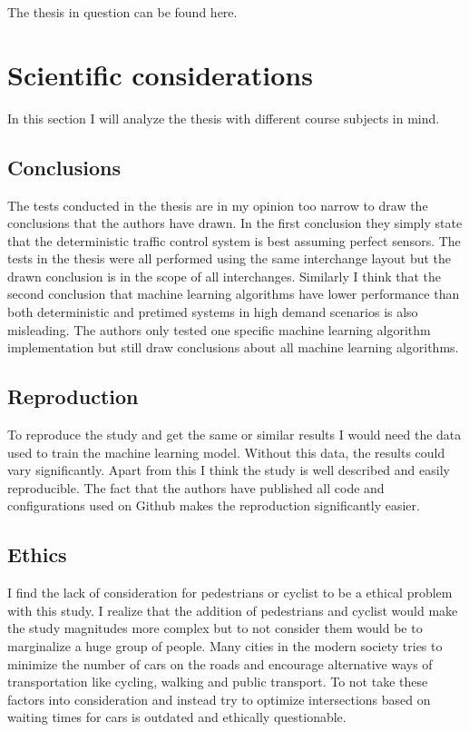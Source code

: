 \documentclass[10pt, a4paper]{article}
\begin{document}
The thesis in question can be found here\cite{thesis}.

\section{Scientific considerations}
In this section I will analyze the thesis with different course subjects in mind.

\subsection{Conclusions}
The tests conducted in the thesis are in my opinion too narrow to draw the conclusions that the authors have drawn. In the first conclusion
they simply state that the deterministic traffic control system is best assuming perfect sensors.
The tests in the thesis were all performed using the same interchange layout but the drawn conclusion is in the scope of all interchanges.
Similarly I think that the second conclusion that machine learning algorithms have lower performance than both deterministic and pretimed
systems in high demand scenarios is also misleading. The authors only tested one specific machine learning algorithm implementation but still
draw conclusions about all machine learning algorithms.

\subsection{Reproduction}
To reproduce the study and get the same or similar results I would need the data used to train the machine learning model.
Without this data, the results could vary significantly. Apart from this I think the study is well described and easily reproducible.
The fact that the authors have published all code and configurations used on Github makes the reproduction significantly easier.

\subsection{Ethics}
I find the lack of consideration for pedestrians or cyclist to be a ethical problem with this study. I realize that the addition of pedestrians
and cyclist would make the study magnitudes more complex but to not consider them would be to marginalize a huge group of people.
Many cities in the modern society tries to minimize the number of cars on the roads and encourage alternative ways of transportation
like cycling, walking and public transport. To not take these factors into consideration and instead try to optimize intersections based on
waiting times for cars is outdated and ethically questionable.
\end{document}
